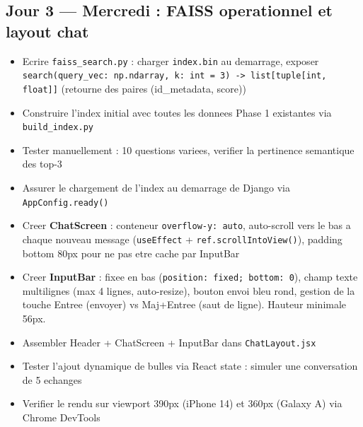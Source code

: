 \documentclass[11pt,a4paper]{article}
\begin{document}
\subsection{Jour 3 --- Mercredi : FAISS operationnel et layout chat}

\begin{ragbox}[Backend --- J3]
\begin{itemize}
    \item[$\square$] Ecrire \texttt{faiss\_search.py} : charger \texttt{index.bin} au demarrage, exposer \texttt{search(query\_vec: np.ndarray, k: int = 3) -> list[tuple[int, float]]} (retourne des paires (id\_metadata, score))
    \item[$\square$] Construire l'index initial avec toutes les donnees Phase 1 existantes via \texttt{build\_index.py}
    \item[$\square$] Tester manuellement : 10 questions variees, verifier la pertinence semantique des top-3
    \item[$\square$] Assurer le chargement de l'index au demarrage de Django via \texttt{AppConfig.ready()}
\end{itemize}
\end{ragbox}

\begin{reactbox}[Frontend --- J3]
\begin{itemize}
    \item[$\square$] Creer \textbf{ChatScreen} : conteneur \texttt{overflow-y: auto}, auto-scroll vers le bas a chaque nouveau message (\texttt{useEffect} + \texttt{ref.scrollIntoView()}), padding bottom 80px pour ne pas etre cache par InputBar
    \item[$\square$] Creer \textbf{InputBar} : fixee en bas (\texttt{position: fixed; bottom: 0}), champ texte multilignes (max 4 lignes, auto-resize), bouton envoi bleu rond, gestion de la touche Entree (envoyer) vs Maj+Entree (saut de ligne). Hauteur minimale 56px.
    \item[$\square$] Assembler Header + ChatScreen + InputBar dans \texttt{ChatLayout.jsx}
    \item[$\square$] Tester l'ajout dynamique de bulles via React state : simuler une conversation de 5 echanges
    \item[$\square$] Verifier le rendu sur viewport 390px (iPhone 14) et 360px (Galaxy A) via Chrome DevTools
\end{itemize}
\end{reactbox}
\end{document}
